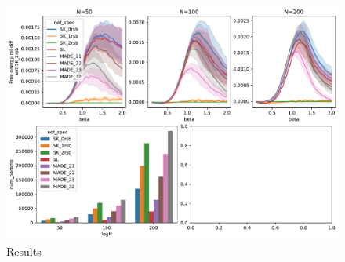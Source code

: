 \documentclass{article}
\begin{document}
\begin{figure}[!h]
    \centering 
    \includegraphics[width=1\textwidth]{img/SK_res.pdf}
    \caption{Results}
    \label{fig:curie_weiss}
\end{figure}
\end{document}
